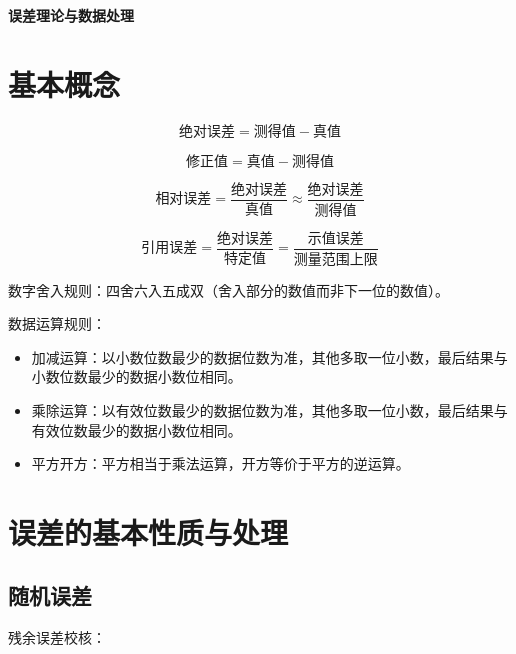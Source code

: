 \documentclass[12pt,a4paper]{ctexart}
\begin{document}
\begin{center}
    {\LARGE \textbf{误差理论与数据处理}}
\end{center}

\section{基本概念}

\begin{equation*}
\text{绝对误差}=\text{测得值}-\text{真值}
\end{equation*}

\begin{equation*}
\text{修正值}=\text{真值}-\text{测得值}
\end{equation*}

\begin{equation*}
\text{相对误差}=\frac{\text{绝对误差}}{\text{真值}} \approx \frac{\text{绝对误差}}{\text{测得值}}
\end{equation*}

\begin{equation*}
\text{引用误差}=\frac{\text{绝对误差}}{\text{特定值}}=\frac{\text{示值误差}}{\text{测量范围上限}}
\end{equation*}

数字舍入规则：四舍六入五成双（舍入部分的数值而非下一位的数值）。

数据运算规则：
\begin{itemize}
\item 加减运算：以小数位数最少的数据位数为准，其他多取一位小数，最后结果与小数位数最少的数据小数位相同。
\item 乘除运算：以有效位数最少的数据位数为准，其他多取一位小数，最后结果与有效位数最少的数据小数位相同。
\item 平方开方：平方相当于乘法运算，开方等价于平方的逆运算。
\end{itemize}

\section{误差的基本性质与处理}

\subsection{随机误差}

残余误差校核：
\end{document}
